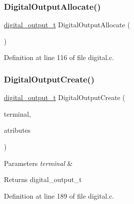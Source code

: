 \mbox{\label{group__hal_ga3b2fffa289b1c6487cb7be064252fb5e}} 
\subsubsection{\texorpdfstring{Digital\+Output\+Allocate()}{DigitalOutputAllocate()}}
{\footnotesize\ttfamily \hyperlink{group___plantilla_ga3e63b19d3d0dbfbfb2c50b3ac1f69aa0}{digital\+\_\+output\+\_\+t} Digital\+Output\+Allocate (\begin{DoxyParamCaption}\item[{void}]{ }\end{DoxyParamCaption})}



Definition at line 116 of file digital.\+c.

\mbox{\label{group__hal_ga594d436025e4739b9629e91e8e356206}} 
\subsubsection{\texorpdfstring{Digital\+Output\+Create()}{DigitalOutputCreate()}}
{\footnotesize\ttfamily \hyperlink{group___plantilla_ga3e63b19d3d0dbfbfb2c50b3ac1f69aa0}{digital\+\_\+output\+\_\+t} Digital\+Output\+Create (\begin{DoxyParamCaption}\item[{\hyperlink{group__hal_ga64d2a4cb83c256a6ace36ce64935997f}{terminal\+\_\+t}}]{terminal,  }\item[{\hyperlink{group__hal_ga52de0d94c690b3251abf626bc86dfed9}{digital\+\_\+output\+\_\+atributes\+\_\+t}}]{atributes }\end{DoxyParamCaption})}


\begin{DoxyParams}{Parameters}
{\em terminal} & \\
\hline
\end{DoxyParams}
\begin{DoxyReturn}{Returns}
digital\+\_\+output\+\_\+t 
\end{DoxyReturn}


Definition at line 189 of file digital.\+c.


